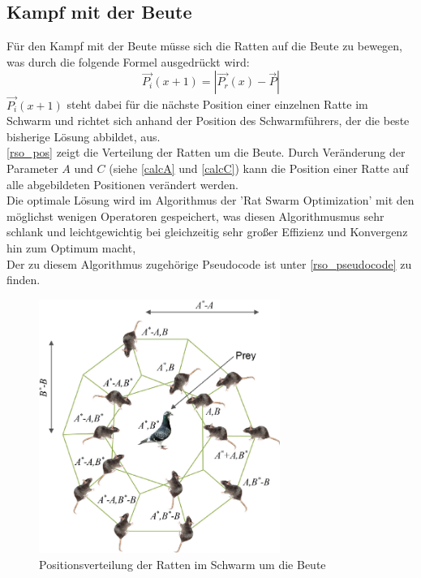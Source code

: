 \subsection{Kampf mit der Beute}
Für den Kampf mit der Beute müsse sich die Ratten auf die Beute zu bewegen, was durch die folgende Formel ausgedrückt wird: 
\begin{equation}
    \vec{P_i}(x+1) = |\vec{P_r}(x) - \vec{P}|
    \label{calcPNext}
\end{equation}
$\vec{P_i}(x+1)$ steht dabei für die nächste Position einer einzelnen Ratte im Schwarm und richtet sich anhand der Position des Schwarmführers, der die beste bisherige Lösung abbildet, aus.\\
\autoref{rso_pos} zeigt die Verteilung der Ratten um die Beute. Durch Veränderung der Parameter $A$ und $C$ (siehe \autoref{calcA} und \autoref{calcC}) kann die Position einer Ratte auf alle abgebildeten Positionen verändert werden. \\ 
Die optimale Lösung wird im Algorithmus der 'Rat Swarm Optimization' mit den möglichst wenigen Operatoren gespeichert, was diesen Algorithmusmus sehr schlank und leichtgewichtig bei gleichzeitig sehr großer Effizienz und Konvergenz hin zum Optimum macht, \cite[vgl. Gaurav Dhiman, S.4]{dhiman_garg_nagar_kumar_dehghani_2020}\\
Der zu diesem Algorithmus zugehörige Pseudocode ist unter \autoref{rso_pseudocode} zu finden.
\begin{figure}[ht]
    \begin{center}
        \includegraphics[width=0.7\textwidth]{assets/img/12652_2020_2580_Fig1_HTML.png}
        \caption[Positionsverteilung der Ratten im Schwarm um die Beute]{Positionsverteilung der Ratten im Schwarm um die Beute \cite{dhiman_garg_nagar_kumar_dehghani_2020}}
        \label{rso_pos}
    \end{center}
\end{figure}


